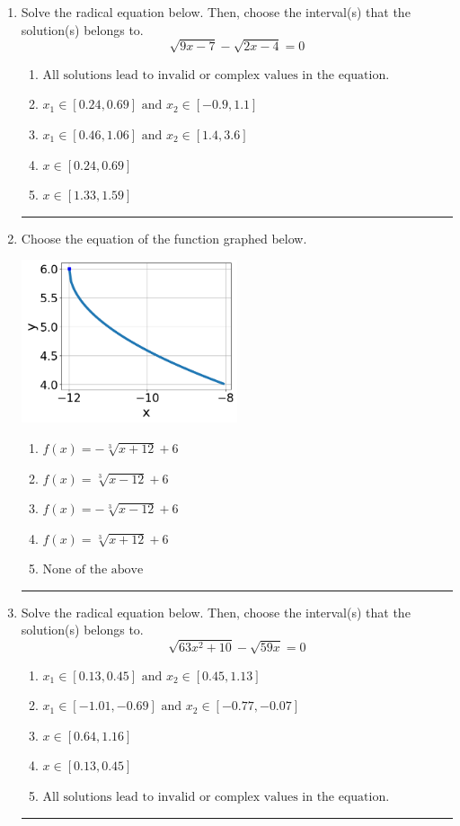 \documentclass[14pt]{extbook}
\newcommand{\litem}[1]{\item#1\hspace*{-1cm}\rule{\textwidth}{0.4pt}}
\begin{document}
\begin{enumerate}
{\begin{enumerate}[label=\Alph*.]
\end{enumerate} }
\litem{
Solve the radical equation below. Then, choose the interval(s) that the solution(s) belongs to.\[ \sqrt{9 x - 7} - \sqrt{2 x - 4} = 0 \]\begin{enumerate}[label=\Alph*.]
\item \( \text{All solutions lead to invalid or complex values in the equation.} \)
\item \( x_1 \in [0.24, 0.69] \text{ and } x_2 \in [-0.9,1.1] \)
\item \( x_1 \in [0.46, 1.06] \text{ and } x_2 \in [1.4,3.6] \)
\item \( x \in [0.24,0.69] \)
\item \( x \in [1.33,1.59] \)

\end{enumerate} }
\litem{
Choose the equation of the function graphed below.
\begin{center}
    \includegraphics[width=0.5\textwidth]{../Figures/radicalGraphToEquationB.png}
\end{center}
\begin{enumerate}[label=\Alph*.]
\item \( f(x) = - \sqrt[3]{x + 12} + 6 \)
\item \( f(x) = \sqrt[3]{x - 12} + 6 \)
\item \( f(x) = - \sqrt[3]{x - 12} + 6 \)
\item \( f(x) = \sqrt[3]{x + 12} + 6 \)
\item \( \text{None of the above} \)

\end{enumerate} }
\litem{
Solve the radical equation below. Then, choose the interval(s) that the solution(s) belongs to.\[ \sqrt{63 x^2 + 10} - \sqrt{59 x} = 0 \]\begin{enumerate}[label=\Alph*.]
\item \( x_1 \in [0.13, 0.45] \text{ and } x_2 \in [0.45,1.13] \)
\item \( x_1 \in [-1.01, -0.69] \text{ and } x_2 \in [-0.77,-0.07] \)
\item \( x \in [0.64,1.16] \)
\item \( x \in [0.13,0.45] \)
\item \( \text{All solutions lead to invalid or complex values in the equation.} \)


\end{enumerate}}
\end{enumerate}
\end{document}
